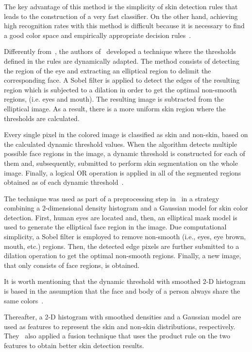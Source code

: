 The key advantage of this method is the simplicity of skin detection rules that leads to the construction of a very fast classifier. On the other hand, achieving high recognition rates with this method is difficult because it is necessary to find a good color space and empirically appropriate decision rules~\citep{vezhnevets:03}.

Differently from~\citet{kovac:03}, the authors of~\citet{yogarajah:11} developed a technique where the thresholds defined in the rules are dynamically adapted. The method consists of detecting the region of the eye and extracting an elliptical region to delimit the corresponding face. A Sobel filter is applied to detect the edges of the resulting region which is subjected to a dilation in order to get the optimal non-smooth regions, (i.e. eyes and mouth). The resulting image is subtracted from the elliptical image. As a result, there is a more uniform skin region where the thresholds are calculated.

Every single pixel in the colored image is classified as skin and non-skin, based on the calculated dynamic threshold values. When the algorithm detects multiple possible face regions in the image, a dynamic threshold is constructed for each of them and, subsequently, submitted to perform skin segmentation on the whole image. Finally, a logical OR operation is applied in all of the segmented regions obtained as of each dynamic threshold~\citep{yogarajah:11}.

The technique was used as part of a preprocessing step in~\citet{tan:12} in a strategy combining a $2$-dimensional density histogram and a Gaussian model for skin color detection. First, human eyes are located and, then, an elliptical mask model is used to generate the elliptical face region in the image. Due computational simplicity, a Sobel filter is employed to remove non-smooth (i.e., eyes, eye brown, mouth, etc.) regions. Then, the detected edge pixels are further submitted to a dilation operation to get the optimal non-smooth regions. Finally, a new image, that only consists of face regions, is obtained.

It is worth mentioning that the dynamic threshold with smoothed 2-D histogram is based in the assumption that the face and body of a person always share the same colors~\citep{tan:12}.

Thereafter, a 2-D histogram with smoothed densities and a Gaussian model are used as features to represent the skin and non-skin distributions, respectively. They~\citep{tan:12} also applied a fusion technique that uses the product rule on the two features to obtain better skin detection results.

